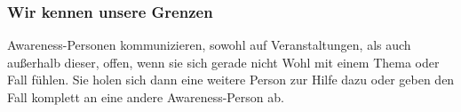 \documentclass{article}
\begin{document}
\subsubsection{Wir kennen unsere Grenzen}
Awareness-Personen kommunizieren, sowohl auf Veranstaltungen, als auch außerhalb dieser, offen, wenn sie sich gerade nicht Wohl mit einem Thema oder Fall fühlen. Sie holen sich dann eine weitere Person zur Hilfe dazu oder geben den Fall komplett an eine andere Awareness-Person ab. 
\end{document}
